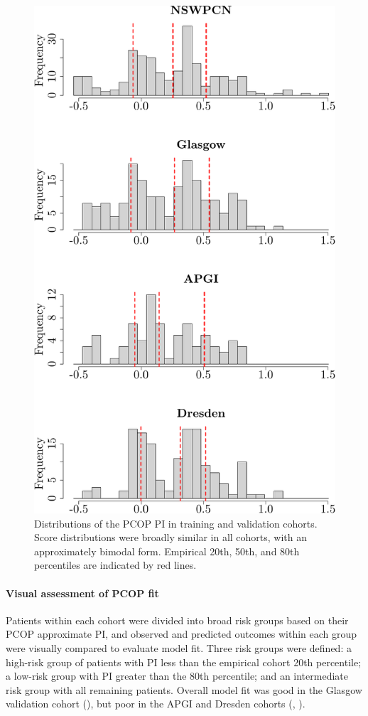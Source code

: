 \documentclass[dissertation.tex]{subfiles}
\begin{document}
\begin{figure}
\centering
  \includegraphics[width=.7\linewidth]{analysis/nomogram/figure/07-score-hists-1}
  \caption[\texorpdfstring{\acrshort{PCOP}}{PCOP} \texorpdfstring{\acrshort{PI}}{PI} distributions in training and validation cohorts]{Distributions of the \acrshort{PCOP} \acrshort{PI} in training and validation cohorts.  Score distributions were broadly similar in all cohorts, with an approximately bimodal form.  Empirical 20th, 50th, and 80th percentiles are indicated by red lines.}
\label{fig:nomo-score-hists}
\end{figure}

\paragraph{Visual assessment of \texorpdfstring{\acrshort{PCOP}}{PCOP} fit}
Patients within each cohort were divided into broad risk groups based on their \gls{PCOP} approximate \gls{PI}, and observed and predicted outcomes within each group were visually compared to evaluate model fit.  Three risk groups were defined: a high-risk group of patients with \gls{PI} less than the empirical cohort 20th percentile; a low-risk group with \gls{PI} greater than the 80th percentile; and an intermediate risk group with all remaining patients.  Overall model fit was good in the Glasgow validation cohort (), but poor in the \gls{APGI} and Dresden cohorts (, ).  
\end{document}
